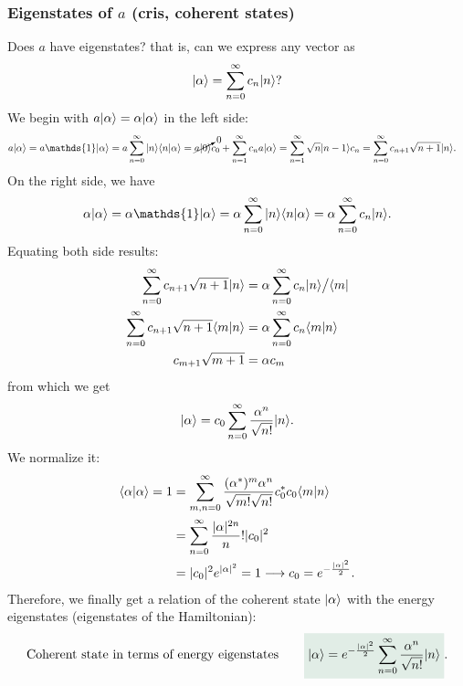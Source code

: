 \subsubsection{Eigenstates of $a$ (cris, coherent states)}
Does $a$ have eigenstates? that is, can we express any vector as 
\begin{align*}
    |\alpha\rangle=\sum_{n=0}^\infty c_n|n\rangle?
\end{align*}
We begin with $a|\alpha\rangle=\alpha|\alpha\rangle$ in the left side:
\begin{align*}
    a\ket{\alpha}&=a\mathds{1}\ket{\alpha}=a\sum_{n=0}^\infty\ket{n}\braket{n|\alpha}=\cancelto{0}{a\ket{0}}c_0+\sum_{n=1}^\infty c_na\ket{\alpha}=\sum_{n=1}^\infty\sqrt{n}\ket{n-1}c_n=\sum_{n=0}^\infty c_{n+1}\sqrt{n+1}\ket{n}.
\end{align*}
On the right side, we have 
\begin{align*}
    \alpha\ket{\alpha}=\alpha\mathds{1}\ket{\alpha}=\alpha\sum_{n=0}^\infty \ket{n}\braket{n|\alpha}=\alpha\sum_{n=0}^\infty c_n\ket{n}.
\end{align*}
Equating both side results:
\begin{align*}
    \sum_{n=0}^\infty c_{n+1}\sqrt{n+1}|n\rangle&=\alpha\sum_{n=0}^\infty c_n|n\rangle\bigr/\langle m|\\
    \sum_{n=0}^\infty c_{n+1}\sqrt{n+1}\langle m|n\rangle&=\alpha\sum_{n=0}^\infty c_n\langle m|n\rangle\\
    c_{m+1}\sqrt{m+1}&=\alpha c_m
\end{align*}
from which we get 
\begin{align*}
    |\alpha\rangle=c_0\sum_{n=0}^\infty \frac{\alpha^n}{\sqrt{n!}}|n\rangle.
\end{align*}
We normalize it:
\begin{align*}
    \langle\alpha|\alpha\rangle=1&=\sum_{m,n=0}^\infty \frac{(\alpha^*)^m\alpha^n}{\sqrt{m!}\sqrt{n!}}c_0^*c_0\langle m|n\rangle\\
    &=\sum_{n=0}^\infty \frac{|\alpha|^{2n}}n!|c_0|^2\\
    &=|c_0|^2e^{|\alpha|^2}=1\longrightarrow c_0=e^{-\frac{|\alpha|^2}{2}}.
\end{align*}
Therefore, we finally get a relation of the coherent state $|\alpha\rangle$ with the energy eigenstates (eigenstates of the Hamiltonian):
\begin{align}
    \text{Coherent state in terms of energy eigenstates}\qquad\highlight{\ket{\alpha}=e^{-\frac{|\alpha|^2}{2}}\sum_{n=0}^\infty \frac{\alpha^n}{\sqrt{n!}}\ket{n}}.
\end{align}
%
